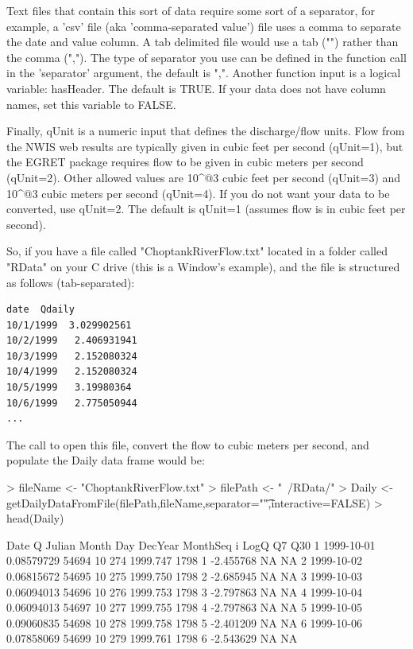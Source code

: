 \documentclass[a4paper,11pt]{article}
\begin{document}
Text files that contain this sort of data require some sort of a separator, for example, a 'csv' file (aka 'comma-separated value') file uses a comma to separate the date and value column. A tab delimited file would use a tab ("\verb@\t@") rather than the comma (","). The type of separator you use can be defined in the function call in the 'separator' argument, the default is ",". Another function input is a logical variable: hasHeader.  The default is TRUE. If your data does not have column names, set this variable to FALSE.

Finally, qUnit is a numeric input that defines the discharge/flow units. Flow from the NWIS web results are typically given in cubic feet per second (qUnit=1), but the EGRET package requires flow to be given in cubic meters per second (qUnit=2). Other allowed values are 10\verb@^@3 cubic feet per second (qUnit=3) and 10\verb@^@3 cubic meters per second (qUnit=4). If you do not want your data to be converted, use qUnit=2. The default is qUnit=1 (assumes flow is in cubic feet per second).

So, if you have a file called "ChoptankRiverFlow.txt" located in a folder called "RData" on your C drive (this is a Window's example), and the file is structured as follows (tab-separated):
\begin{verbatim}
date  Qdaily
10/1/1999  3.029902561
10/2/1999	2.406931941
10/3/1999	2.152080324
10/4/1999	2.152080324
10/5/1999	3.19980364
10/6/1999	2.775050944
...
\end{verbatim}

The call to open this file, convert the flow to cubic meters per second, and populate the Daily data frame would be:
\begin{Schunk}
\begin{Sinput}
> fileName <- "ChoptankRiverFlow.txt"
> filePath <-  "~/RData/"
> Daily <- getDailyDataFromFile(filePath,fileName,separator="\t",interactive=FALSE)
> head(Daily)
\end{Sinput}
\begin{Soutput}
        Date          Q Julian Month Day  DecYear MonthSeq i      LogQ Q7 Q30
1 1999-10-01 0.08579729  54694    10 274 1999.747     1798 1 -2.455768 NA  NA
2 1999-10-02 0.06815672  54695    10 275 1999.750     1798 2 -2.685945 NA  NA
3 1999-10-03 0.06094013  54696    10 276 1999.753     1798 3 -2.797863 NA  NA
4 1999-10-04 0.06094013  54697    10 277 1999.755     1798 4 -2.797863 NA  NA
5 1999-10-05 0.09060835  54698    10 278 1999.758     1798 5 -2.401209 NA  NA
6 1999-10-06 0.07858069  54699    10 279 1999.761     1798 6 -2.543629 NA  NA
\end{Soutput}
\end{Schunk}
\end{document}

